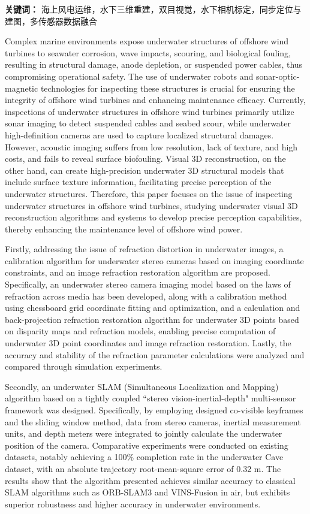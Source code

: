 \noindent \textbf{关键词：} 海上风电运维，水下三维重建，双目视觉，水下相机标定，同步定位与建图，多传感器数据融合

\cleardoublepage
{}

Complex marine environments expose underwater structures of offshore wind turbines to seawater corrosion, wave impacts, scouring, and biological fouling, resulting in structural damage, anode depletion, or suspended power cables, thus compromising operational safety.
The use of underwater robots and sonar-optic-magnetic technologies for inspecting these structures is crucial for ensuring the integrity of offshore wind turbines and enhancing maintenance efficacy.
Currently, inspections of underwater structures in offshore wind turbines primarily utilize sonar imaging to detect suspended cables and seabed scour, while underwater high-definition cameras are used to capture localized structural damages.
However, acoustic imaging suffers from low resolution, lack of texture, and high costs, and fails to reveal surface biofouling. Visual 3D reconstruction, on the other hand, can create high-precision underwater 3D structural models that include surface texture information, facilitating precise perception of the underwater structures.
Therefore, this paper focuses on the issue of inspecting underwater structures in offshore wind turbines, studying underwater visual 3D reconstruction algorithms and systems to develop precise perception capabilities, thereby enhancing the maintenance level of offshore wind power.

Firstly, addressing the issue of refraction distortion in underwater images, a calibration algorithm for underwater stereo cameras based on imaging coordinate constraints, and an image refraction restoration algorithm are proposed.
Specifically, an underwater stereo camera imaging model based on the laws of refraction across media has been developed, along with a calibration method using chessboard grid coordinate fitting and optimization, and a calculation and back-projection refraction restoration algorithm for underwater 3D points based on disparity maps and refraction models, enabling precise computation of underwater 3D point coordinates and image refraction restoration.
Lastly, the accuracy and stability of the refraction parameter calculations were analyzed and compared through simulation experiments.

Secondly, an underwater SLAM (Simultaneous Localization and Mapping) algorithm based on a tightly coupled ``stereo vision-inertial-depth" multi-sensor framework was designed.
Specifically, by employing designed co-visible keyframes and the sliding window method, data from stereo cameras, inertial measurement units, and depth meters were integrated to jointly calculate the underwater position of the camera.
Comparative experiments were conducted on existing datasets, notably achieving a 100\% completion rate in the underwater Cave dataset, with an absolute trajectory root-mean-square error of 0.32 m.
The results show that the algorithm presented achieves similar accuracy to classical SLAM algorithms such as ORB-SLAM3 and VINS-Fusion in air, but exhibits superior robustness and higher accuracy in underwater environments.

